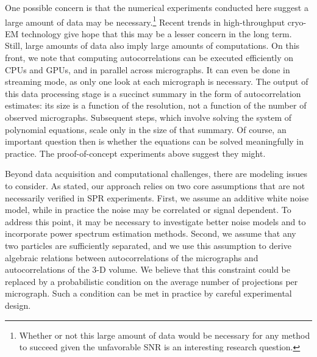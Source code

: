 \documentclass[9pt,twocolumn,twoside,lineno]{pnas-new}
\begin{document}
One possible concern is that the numerical experiments conducted here suggest a large amount of data may be necessary.\footnote{Whether or not this large amount of data would be necessary for any method to succeed given the unfavorable SNR is an interesting research question.} Recent trends in high-throughput cryo-EM technology  give hope that this may be a lesser concern in the long term. Still, large amounts of data also imply large amounts of computations. On this front, we note that computing autocorrelations can be executed efficiently on CPUs and GPUs, and in parallel across micrographs. It can even be done in streaming mode, as only one look at each micrograph is necessary. The output of this data processing stage is a succinct summary in the form of autocorrelation estimates: its size is a function of the resolution, not a function of the number of observed micrographs. Subsequent steps, which involve solving the system of polynomial equations, scale only in the size of that summary. Of course, an important question then is whether the equations can be solved meaningfully in practice. The proof-of-concept experiments above suggest they might. 




Beyond data acquisition and computational challenges, there are modeling issues to consider.
As stated, our approach relies on two core assumptions that are not necessarily verified in SPR experiments.
First, we assume an additive white noise model, while in practice the noise may be correlated or signal dependent. To address this point, it may be necessary to investigate better noise models and to incorporate power spectrum estimation methods. %
Second, we assume that any two particles are sufficiently separated, and we use this assumption to derive algebraic relations between autocorrelations of the micrographs and autocorrelations of the 3-D volume. 
We believe that this constraint could be replaced by a probabilistic condition on the average number of projections per micrograph. 
Such a condition can be met in practice by careful experimental design.
\end{document}
